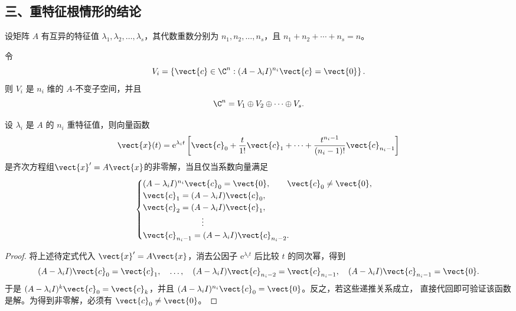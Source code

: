 \subsection*{三、重特征根情形的结论}

设矩阵 $A$ 有互异的特征值
$\lambda_1,\lambda_2,\ldots,\lambda_s$，其代数重数分别为
$n_1,n_2,\ldots,n_s$，且 $n_1+n_2+\cdots+n_s=n$。

\begin{lemma}\label{lem:广义特征子空间分解}
	令
	\[
		V_i
		=\left\{
		\vect{c}\in\C^n:
		(A-\lambda_iI)^{n_i}\vect{c}=\vect{0}
		\right\}.
	\]
	则 $V_i$ 是 $n_i$ 维的 $A$-不变子空间，并且
	\[
		\C^n=V_1\oplus V_2\oplus\cdots\oplus V_s.
	\]
\end{lemma}
\begin{lemma}[待定系数的确定]\label{lem:向量多项式解的递推条件}
	设 $\lambda_i$ 是 $A$ 的 $n_i$ 重特征值，则向量函数
	\[
		\vect{x}(t)
		=\mathrm{e}^{\lambda_it}
		\left[
			\vect{c}_0+\dfrac{t}{1!}\vect{c}_1+\cdots
			+\dfrac{t^{n_i-1}}{(n_i-1)!}\vect{c}_{n_i-1}
		\right]
	\]
	是齐次方程组$\vect{x}'=A\vect{x}$的非零解，当且仅当系数向量满足
	\[
		\begin{cases}
			(A-\lambda_iI)^{n_i}\vect{c}_0=\vect{0},
			\qquad \vect{c}_0\neq\vect{0},\\
			\vect{c}_1=(A-\lambda_iI)\vect{c}_0,\\
			\vect{c}_2=(A-\lambda_iI)\vect{c}_1,\\
			\hspace{2.5cm}\vdots\\
			\vect{c}_{n_i-1}
			=(A-\lambda_iI)\vect{c}_{n_i-2}.
		\end{cases}
	\]
\end{lemma}

\begin{proof}
	将上述待定式代入 $\vect{x}'=A\vect{x}$，消去公因子
	$\mathrm{e}^{\lambda_it}$ 后比较 $t$ 的同次幂，得到
	\[
		(A-\lambda_iI)\vect{c}_0=\vect{c}_1,
		\quad\ldots,\quad
		(A-\lambda_iI)\vect{c}_{n_i-2}=\vect{c}_{n_i-1},
		\quad
		(A-\lambda_iI)\vect{c}_{n_i-1}=\vect{0}.
	\]
	于是
	$(A-\lambda_iI)^k\vect{c}_0=\vect{c}_k$，并且
	$(A-\lambda_iI)^{n_i}\vect{c}_0=\vect{0}$。反之，若这些递推关系成立，
	直接代回即可验证该函数是解。为得到非零解，必须有
	$\vect{c}_0\neq\vect{0}$。
\end{proof}

